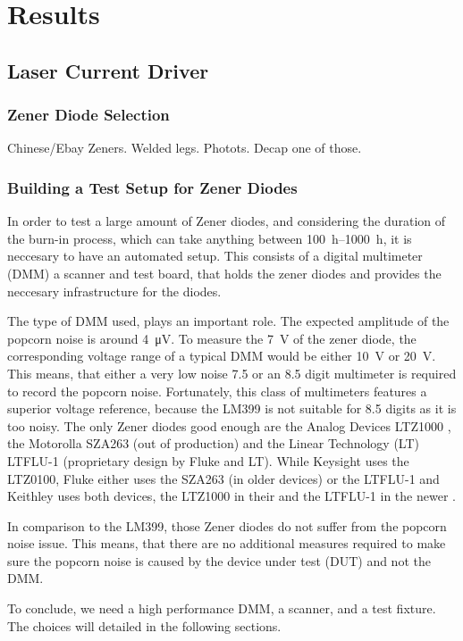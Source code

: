 \chapter{Results}
\section{Laser Current Driver}
\subsection{Zener Diode Selection}
Chinese/Ebay Zeners. Welded legs. Photots. Decap one of those.

\subsection{Building a Test Setup for Zener Diodes}
In order to test a large amount of Zener diodes, and considering the duration of the burn-in process, which can take anything between \qtyrange{100}{1000}{\hour}, it is neccesary to have an automated setup. This consists of a digital multimeter (DMM) a scanner and test board, that holds the zener diodes and provides the neccesary infrastructure for the diodes.

The type of DMM used, plays an important role. The expected amplitude of the popcorn noise is around \qty{4}{\micro\volt}. To measure the \qty{7}{\volt} of the zener diode, the corresponding voltage range of a typical DMM would be either \qty{10}{\volt} or \qty{20}{\volt}. This means, that either a very low noise \num{7.5} or an \num{8.5} digit multimeter is required to record the popcorn noise. Fortunately, this class of multimeters features a superior voltage reference, because the LM399 is not suitable for \num{8.5} digits as it is too noisy. The only Zener diodes good enough are the Analog Devices LTZ1000 \cite{}, the Motorolla SZA263 (out of production) and the Linear Technology (LT) LTFLU-1 (proprietary design by Fluke and LT).  While Keysight uses the LTZ0100, Fluke either uses the SZA263 (in older devices) or the LTFLU-1 and Keithley uses both devices, the LTZ1000 in their  and the LTFLU-1 in the newer .

In comparison to the LM399, those Zener diodes do not suffer from the popcorn noise issue. This means, that there are no additional measures required to make sure the popcorn noise is caused by the device under test (DUT) and not the DMM.

To conclude, we need a high performance DMM, a scanner, and a test fixture. The choices will detailed in the following sections.


